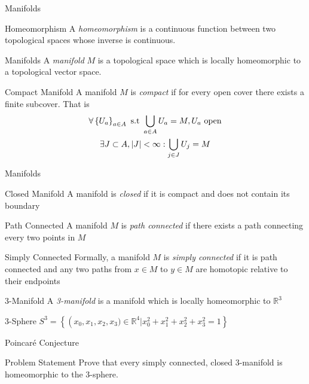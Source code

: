 \documentclass[handout]{beamer}
\newcommand{\Poincare}{Poincar\'{e}}
\newcommand{\Real}{\mathbb{R}}
\begin{document}
  \begin{frame}{Manifolds}
      \linespread{0.8}
      \pause
      \begin{block}{Homeomorphism}
          A \textit{homeomorphism} is a continuous function between two
          topological spaces whose inverse is continuous.
      \end{block}
      \pause
      \begin{block}{Manifolds}
          A \textit{manifold} $M$ is a topological space which is locally
          homeomorphic to a topological vector space.
      \end{block}
      \pause
      \begin{block}{Compact Manifold}
          A manifold $M$ is \textit{compact} if for every open cover there
          exists a finite subcover. That is
          \begin{multline*}
              \linespread{0.8}
          \forall \left\{U_a\right\}_{a \in A} \textrm{ s.t } \bigcup_{a\in A}
          U_a = M,
          U_a \textrm{ open}\\
          \exists J \subset A, |J| < \infty : \bigcup_{j \in J}U_j = M
          \end{multline*}
      \end{block}
  \end{frame}
  \begin{frame}{Manifolds}
      \linespread{0.8}
      \pause
      \begin{block}{Closed Manifold}
          A manifold is \textit{closed} if it is compact and does not contain
          its boundary
      \end{block}
      \pause
      \begin{block}{Path Connected}
          A manifold $M$ is \textit{path connected} if there exists a path
          connecting every two points in $M$
      \end{block}
      \pause
      \begin{block}{Simply Connected}
          Formally, a manifold $M$ is \textit{simply connected} if it is path
          connected and any two paths from $x \in M$ to $y \in M$ are
          homotopic relative to their endpoints
      \end{block}
      \pause
      \begin{block}{3-Manifold}
          A \textit{3-manifold} is a manifold which is locally homeomorphic to
          $\Real^3$
      \end{block}
      \pause
      \begin{block}{3-Sphere}
          $S^3 = \left\{\left(x_0, x_1, x_2, x_3) \in \Real^4 | x_0^2 + x_1^2 + x_2^2 +
          x_3^2 = 1\right\}$
      \end{block}
  \end{frame}
  \begin{frame}{\Poincare{} Conjecture}
      \begin{block}{Problem Statement}
          Prove that every simply connected, closed 3-manifold is
          homeomorphic to the 3-sphere.
      \end{block}
  \end{frame}
\end{document}
